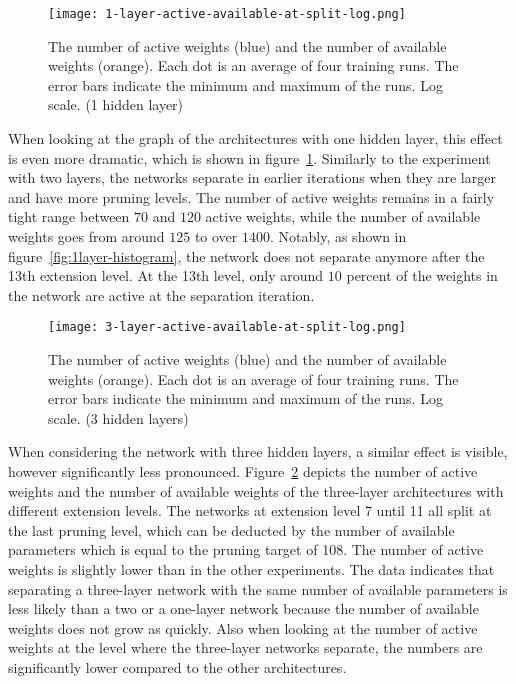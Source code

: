\begin{figure}[t] %
    \centering
    \texttt{[image: 1-layer-active-available-at-split-log.png]}
    \caption[Comparing active and available weights (1 hidden layer)]{
    The number of active weights (blue) and the number of available weights (orange).
    Each dot is an average of four training runs.
    The error bars indicate the minimum and maximum of the runs.
    Log scale.  (1 hidden layer)
}\label{fig:1layer-active}
\end{figure}

When looking at the graph of the architectures with one hidden layer, this effect is even more dramatic, which is shown in figure~\ref{fig:1layer-active}.
Similarly to the experiment with two layers, the networks separate in earlier iterations when they are larger and have more pruning levels.
The number of active weights remains in a fairly tight range between $70$ and $120$ active weights, while the number of available weights goes from around $125$ to over $1400$.
Notably, as shown in figure~\ref{fig:1layer-histogram}, the network does not separate anymore after the 13th extension level.
At the 13th level, only around $10$ percent of the weights in the network are active at the separation iteration.

\begin{figure}[t] %
    \centering
    \texttt{[image: 3-layer-active-available-at-split-log.png]}
    \caption[Comparing active and available weights (3 hidden layers)]{
    The number of active weights (blue) and the number of available weights (orange).
    Each dot is an average of four training runs.
    The error bars indicate the minimum and maximum of the runs.
    Log scale.  (3 hidden layers)
    }\label{fig:3layer-active}
\end{figure}

When considering the network with three hidden layers, a similar effect is visible, however significantly less pronounced.
Figure~\ref{fig:3layer-active} depicts the number of active weights and the number of available weights of the three-layer architectures with different extension levels.
The networks at extension level 7 until 11 all split at the last pruning level, which can be deducted by the number of available parameters which is equal to the pruning target of 108.
The number of active weights is slightly lower than in the other experiments.
The data indicates that separating a three-layer network with the same number of available parameters is less likely than a two or a one-layer network because the number of available weights does not grow as quickly.
Also when looking at the number of active weights at the level where the three-layer networks separate, the numbers are significantly lower compared to the other architectures.

